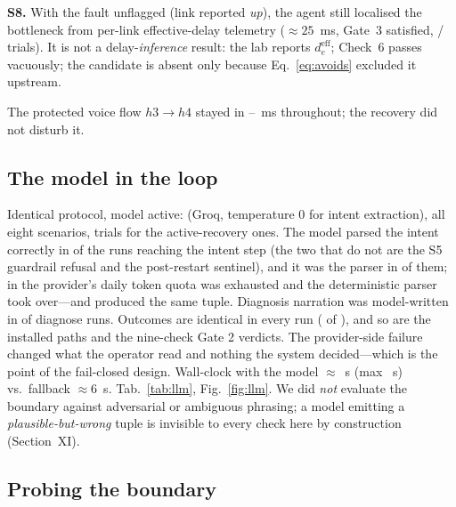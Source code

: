 \documentclass[conference]{IEEEtran}
\begin{document}
\textbf{S8.} With the fault unflagged (link reported \emph{up}), the
agent still localised the bottleneck from per-link effective-delay telemetry
($\approx 25$~ms, Gate~3 satisfied, \NoOracleTrials{}/\NoOracleTrials{}
trials). It is not a delay-\emph{inference} result: the lab reports
$d^{\mathrm{eff}}_e$; Check~6 passes vacuously; the candidate is absent
only because Eq.~\eqref{eq:avoids} excluded it upstream.

The protected voice flow $h3\!\to\!h4$ stayed in
\VoiceMin{}--\VoiceMax{}~ms throughout; the recovery did not disturb it.

\subsection{The model in the loop}
\label{sec:llm}

Identical protocol, model active: \LlmModel{} (Groq, temperature $0$ for
intent extraction), all eight scenarios, \RecoveryTrials{} trials for the
active-recovery ones. The model parsed the intent correctly in
\LlmParseOk{} of the runs reaching the intent step (the two that do not
are the S5 guardrail refusal and the post-restart sentinel), and it was
the parser in \LlmParsedByModel{} of them; in \LlmParseFallback{} the
provider's daily token quota was exhausted and the deterministic parser
took over---and produced the same tuple. Diagnosis narration was
model-written in \LlmNarrationRuns{} of \LlmDiagnoseRuns{} diagnose runs.
Outcomes are identical in every run (\LlmOutcomesMatch{} of \LlmRuns{}),
and so are the installed paths and the nine-check Gate 2 verdicts. The
provider-side failure changed what the operator read and nothing the
system decided---which is the point of the fail-closed design. Wall-clock
with the model $\approx$\LlmClockMean{}~s (max \LlmClockMax{}~s)
vs.\ fallback $\approx 6$~s. Tab.~\ref{tab:llm}, Fig.~\ref{fig:llm}. We
did \emph{not} evaluate the boundary against adversarial or ambiguous
phrasing; a model emitting a \emph{plausible-but-wrong} tuple is invisible
to every check here by construction (Section~XI).



\subsection{Probing the boundary}
\label{sec:probe}
\end{document}
